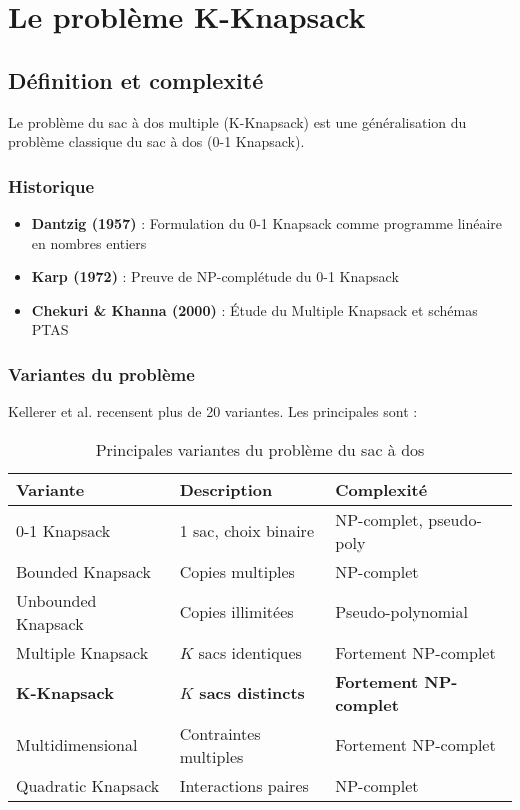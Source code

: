 \documentclass[12pt,a4paper]{article}
\theoremstyle{definition}
\theoremstyle{remark}
\begin{document}
\section{Le problème K-Knapsack}

\subsection{Définition et complexité}

Le problème du sac à dos multiple (K-Knapsack) est une généralisation du problème classique du sac à dos (0-1 Knapsack).

\subsubsection{Historique}

\begin{itemize}
    \item \textbf{Dantzig (1957)} : Formulation du 0-1 Knapsack comme programme linéaire en nombres entiers \cite{dantzig1957discrete}
    
    \item \textbf{Karp (1972)} : Preuve de NP-complétude du 0-1 Knapsack \cite{karp1972reducibility}
    
    \item \textbf{Chekuri \& Khanna (2000)} : Étude du Multiple Knapsack et schémas PTAS \cite{chekuri2000polynomial}
\end{itemize}

\subsubsection{Variantes du problème}

Kellerer et al. \cite{kellerer2004knapsack} recensent plus de 20 variantes. Les principales sont :

\begin{table}[h]
\centering
\begin{tabular}{|l|l|l|}
\hline
\textbf{Variante} & \textbf{Description} & \textbf{Complexité} \\
\hline
0-1 Knapsack & 1 sac, choix binaire & NP-complet, pseudo-poly \\
Bounded Knapsack & Copies multiples & NP-complet \\
Unbounded Knapsack & Copies illimitées & Pseudo-polynomial \\
Multiple Knapsack & $K$ sacs identiques & Fortement NP-complet \\
\textbf{K-Knapsack} & \textbf{$K$ sacs distincts} & \textbf{Fortement NP-complet} \\
Multidimensional & Contraintes multiples & Fortement NP-complet \\
Quadratic Knapsack & Interactions paires & NP-complet \\
\hline
\end{tabular}
\caption{Principales variantes du problème du sac à dos}
\end{table}
\end{document}
